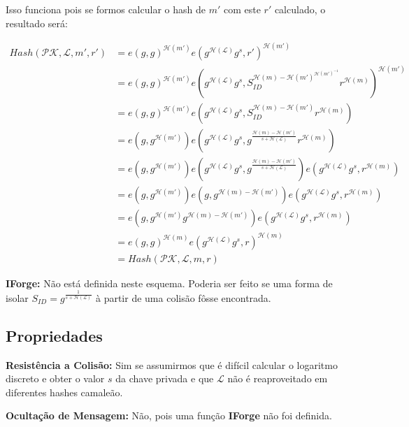 \documentclass[a4paper]{article}
\begin{document}
Isso funciona pois se formos calcular o hash de $m'$ com este $r'$
calculado, o resultado será:

\begin{equation}
\begin{split}
  Hash(\mathcal{PK},\mathcal{L}, m', r') &= e(g, g)^{\mathcal{H}(m')}e(g^{\mathcal{H}(\mathcal{L})}g^s, r')^{\mathcal{H}(m')}\\
  &= e(g, g)^{\mathcal{H}(m')}e(g^{\mathcal{H}(\mathcal{L})}g^s, S_{ID}^{\mathcal{H}(m)-\mathcal{H}(m')^{\mathcal{H}(m')^{-1}}}r^{\mathcal{H}(m)})^{\mathcal{H}(m')}\\
  &= e(g, g)^{\mathcal{H}(m')}e(g^{\mathcal{H}(\mathcal{L})}g^s, S_{ID}^{\mathcal{H}(m)-\mathcal{H}(m')}r^{\mathcal{H}(m)})\\
  &= e(g, g^{\mathcal{H}(m')})e(g^{\mathcal{H}(\mathcal{L})}g^s, g^{\frac{\mathcal{H}(m)-\mathcal{H}(m')}{s+\mathcal{H}(\mathcal{L})}}r^{\mathcal{H}(m)})\\
&= e(g, g^{\mathcal{H}(m')})e(g^{\mathcal{H}(\mathcal{L})}g^s, g^{\frac{\mathcal{H}(m)-\mathcal{H}(m')}{s+\mathcal{H}(\mathcal{L})}})e(g^{\mathcal{H}(\mathcal{L})}g^s, r^{\mathcal{H}(m)})\\
  &= e(g, g^{\mathcal{H}(m')})e(g, g^{\mathcal{H}(m)-\mathcal{H}(m')})e(g^{\mathcal{H}(\mathcal{L})}g^s, r^{\mathcal{H}(m)})\\
  &= e(g, g^{\mathcal{H}(m')}g^{\mathcal{H}(m)-\mathcal{H}(m')})e(g^{\mathcal{H}(\mathcal{L})}g^s, r^{\mathcal{H}(m)})\\
  &= e(g, g)^{\mathcal{H}(m)}e(g^{\mathcal{H}(\mathcal{L})}g^s, r)^{\mathcal{H}(m)}\\
&= Hash(\mathcal{PK},\mathcal{L}, m, r)
\end{split}
\end{equation}

\textbf{IForge:} Não está definida neste esquema. Poderia ser feito se
uma forma de isolar $S_{ID} =
g^{\frac{1}{s+\mathcal{H}(\mathcal{L})}}$ à partir de uma colisão
fôsse encontrada.

\subsection{Propriedades}

\textbf{Resistência a Colisão: }Sim se assumirmos que é difícil
calcular o logaritmo discreto e obter o valor $s$ da chave privada e
que $\mathcal{L}$ não é reaproveitado em diferentes hashes camaleão.

\textbf{Ocultação de Mensagem: }Não, pois uma função \textbf{IForge}
não foi definida.
\end{document}

